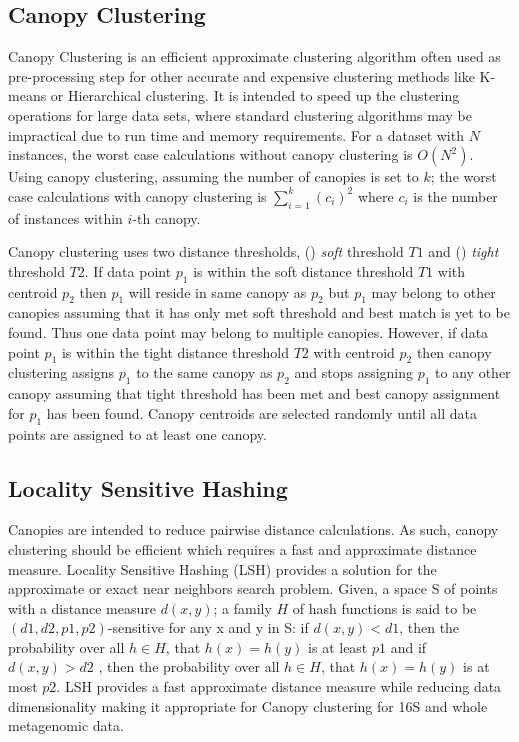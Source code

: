 \documentclass[10pt, conference, compsocconf]{IEEEtran}
\begin{document}
\subsection{\textbf{Canopy Clustering}}

Canopy Clustering \cite{MARCanopy} is an efficient approximate 
clustering algorithm often used as pre-processing step for other accurate and expensive clustering methods like  K-means or Hierarchical clustering. It
is intended to speed up the 
clustering operations for 
large data sets, where standard clustering algorithms may be 
impractical due to  run time and memory requirements. 
%
For a dataset with $N$ instances, the 
worst case calculations without canopy 
clustering is $O(N^2)$. Using canopy clustering, 
assuming the number of 
canopies is set to 
$k$; the 
worst case calculations with canopy clustering is $\sum_{i=1}^{k}(c_i)^2$ where $c_i$ is the number of instances within $i$-th canopy.


Canopy clustering uses two distance 
thresholds, () \textit{soft} threshold $T1$ and () \textit{tight} threshold $T2$. If data point $p_1$ is within the 
soft distance threshold $T1$ with centroid $p_2$ then $p_1$ will reside in same canopy as $p_2$ but $p_1$ may belong to other 
canopies assuming that it has only met soft threshold and best match is yet to be found. Thus one data point may belong to multiple canopies. However, 
if data point $p_1$ is within the tight distance threshold $T2$ with centroid $p_2$ then canopy clustering assigns $p_1$ to the same canopy as $p_2$ and stops 
  assigning $p_1$ to any other canopy assuming that tight threshold has been met and 
  best canopy assignment for $p_1$ has been found. Canopy centroids are selected randomly until all data points are
  assigned to at least one canopy. 


\subsection{\textbf{Locality Sensitive Hashing}}

Canopies are intended to reduce pairwise distance calculations. As such, canopy clustering 
should be efficient which requires a fast and approximate distance measure. Locality Sensitive Hashing (LSH) \cite{MARLshRef2} provides a solution 
for the approximate or exact near neighbors search problem. Given,  a space S of points with a 
  distance measure $d(x,y)$; a family $H$ of hash functions is said to be $(d1, d2, p1, p2)$-sensitive for any x and 
  y in S: if $d(x, y)<d1$, then the probability over all $h\in{H}$, that $h(x)=h(y)$ is at least $p1$ and if $d(x, y)>d2$ , then the probability over 
  all $h\in{H}$, that $h(x)=h(y)$ is at most $p2$. LSH provides a fast approximate distance measure while reducing 
  data dimensionality making it 
  appropriate for Canopy clustering for 
  16S and whole metagenomic data.
\end{document}
